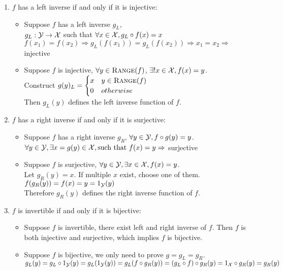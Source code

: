 \problem
\begin{enumerate}
\item $f$ has a left inverse if and only if it is injective:
\begin{itemize}
	\item Suppose $f$ has a left inverse $g_L$, \\
	$g_L:\mathcal{Y} \rightarrow \mathcal{X}$ such that $\forall x\in \mathcal{X}, g_L \circ f(x) = x$ \\
	$f(x_1)=f(x_2) \Rightarrow g_L(f(x_1)) = g_L(f(x_2)) \Rightarrow x_1 = x_2 \Rightarrow$ injective
	\item Suppose $f$ is injective, $\forall y \in {\mbox{\sc{Range}}}(f)$, $\exists ! x \in \mathcal{X}, f(x) = y$. \\
	Construct $g(y)_L = \begin{cases}
	x & y \in {\mbox{\sc{Range}}}(f) \\
	0 & otherwise
	\end{cases}$ \\
	Then $g_L(y)$ defines the left inverse function of $f$.
\end{itemize}

\item $f$ has a right inverse if and only if it is surjective:
\begin{itemize}
	\item Suppose $f$ has a right inverse $g_R$, $\forall y \in \mathcal{Y}, f \circ g(y) = y$. \\
	$\forall y \in \mathcal{Y}, \exists x = g(y) \in \mathcal{X}, \text{such that } f(x) = y \Rightarrow$ surjective
	\item Suppose $f$ is surjective, $\forall y \in \mathcal{Y}, \exists x \in \mathcal{X}, f(x) = y$. \\
	Let $g_R(y) = x$. If multiple $x$ exist, choose one of them.
	$f(g_R(y)) = f(x) = y = 1_{\mathcal{Y}}(y)$ \\
	Therefore $g_R(y)$ defines the right inverse function of $f$.
\end{itemize}

\item $f$ is invertible if and only if it is bijective:
\begin{itemize}
	\item Suppose $f$ is invertible, there exist left and right inverse of $f$. Then $f$ is both injective and surjective, which implies $f$ is bijective.
	\item Suppose $f$ is bijective, we only need to prove $g = g_L = g_R$. \\
	$g_L(y) = g_L \circ 1_{\mathcal{Y}}(y) = g_L(1_{\mathcal{Y}}(y)) = g_L(f\circ g_R(y)) = (g_L \circ f) \circ g_R (y) = 1_{\mathcal{X}} \circ g_R (y) = g_R(y) $
\end{itemize}
\end{enumerate} \QED